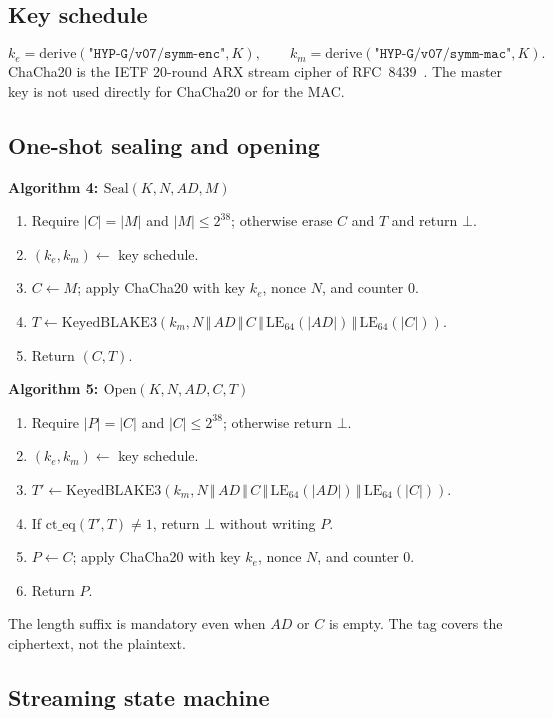 \documentclass[11pt,a4paper]{article}
\theoremstyle{plain}
\theoremstyle{definition}
\theoremstyle{remark}
\newcommand{\concat}{\,\Vert\,}
\newenvironment{steps}[1]
  {\par\medskip\noindent\textbf{#1}\par\nopagebreak\small
   \begin{enumerate}[label=\arabic*:,leftmargin=*]}
  {\end{enumerate}\par\medskip}
\begin{document}
\subsection{Key schedule}

\[
 k_e=\mathrm{derive}(\texttt{"HYP-G/v07/symm-enc"},K),\qquad
 k_m=\mathrm{derive}(\texttt{"HYP-G/v07/symm-mac"},K).
\]
ChaCha20 is the IETF 20-round ARX stream cipher of RFC~8439~\cite{rfc8439}.  The master key is not used directly for ChaCha20 or for the MAC.

\subsection{One-shot sealing and opening}

\begin{steps}{Algorithm 4: $\mathrm{Seal}(K,N,AD,M)$}
\item Require $|C|=|M|$ and $|M|\le2^{38}$; otherwise erase $C$ and
  $T$ and return $\bot$.
\item $(k_e,k_m)\gets$ key schedule.
\item $C\gets M$; apply ChaCha20 with key $k_e$, nonce $N$, and
  counter $0$.
\item $T\gets\mathrm{KeyedBLAKE3}(k_m,
  N\concat AD\concat C\concat\mathrm{LE}_{64}(|AD|)
  \concat\mathrm{LE}_{64}(|C|))$.
\item Return $(C,T)$.
\end{steps}

\begin{steps}{Algorithm 5: $\mathrm{Open}(K,N,AD,C,T)$}
\item Require $|P|=|C|$ and $|C|\le2^{38}$; otherwise return $\bot$.
\item $(k_e,k_m)\gets$ key schedule.
\item $T'\gets\mathrm{KeyedBLAKE3}(k_m,
  N\concat AD\concat C\concat\mathrm{LE}_{64}(|AD|)
  \concat\mathrm{LE}_{64}(|C|))$.
\item If $\mathrm{ct\_eq}(T',T)\ne1$, return $\bot$ without writing
  $P$.
\item $P\gets C$; apply ChaCha20 with key $k_e$, nonce $N$, and
  counter $0$.
\item Return $P$.
\end{steps}

The length suffix is mandatory even when $AD$ or $C$ is empty.  The
tag covers the ciphertext, not the plaintext.

\subsection{Streaming state machine}
\end{document}
